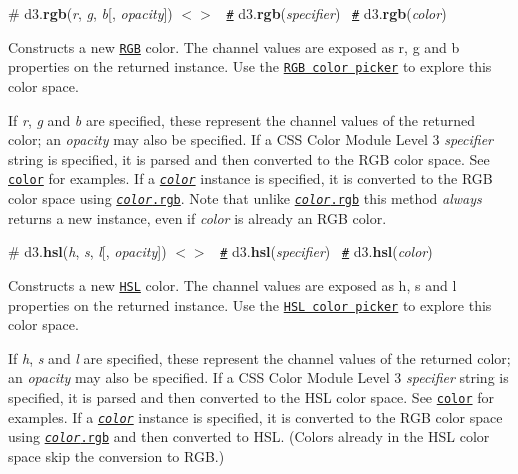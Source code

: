 \label{_rgb}%
\# d3.{\bfseries rgb}({\itshape r}, {\itshape g}, {\itshape b}\mbox{[}, {\itshape opacity}\mbox{]}) \href{https://github.com/d3/d3-color/blob/master/src/color.js#L209}{\tt $<$$>$}~\newline
 \href{#rgb}{\tt \#} d3.{\bfseries rgb}({\itshape specifier})~\newline
 \href{#rgb}{\tt \#} d3.{\bfseries rgb}({\itshape color})~\newline


Constructs a new \href{https://en.wikipedia.org/wiki/RGB_color_model}{\tt R\+GB} color. The channel values are exposed as {\ttfamily r}, {\ttfamily g} and {\ttfamily b} properties on the returned instance. Use the \href{http://bl.ocks.org/mbostock/78d64ca7ef013b4dcf8f}{\tt R\+GB color picker} to explore this color space.

If {\itshape r}, {\itshape g} and {\itshape b} are specified, these represent the channel values of the returned color; an {\itshape opacity} may also be specified. If a C\+SS Color Module Level 3 {\itshape specifier} string is specified, it is parsed and then converted to the R\+GB color space. See \href{#color}{\tt color} for examples. If a \href{#color}{\tt {\itshape color}} instance is specified, it is converted to the R\+GB color space using \href{#color_rgb}{\tt {\itshape color}.rgb}. Note that unlike \href{#color_rgb}{\tt {\itshape color}.rgb} this method {\itshape always} returns a new instance, even if {\itshape color} is already an R\+GB color.

\label{_hsl}%
\# d3.{\bfseries hsl}({\itshape h}, {\itshape s}, {\itshape l}\mbox{[}, {\itshape opacity}\mbox{]}) \href{https://github.com/d3/d3-color/blob/master/src/color.js#L281}{\tt $<$$>$}~\newline
 \href{#hsl}{\tt \#} d3.{\bfseries hsl}({\itshape specifier})~\newline
 \href{#hsl}{\tt \#} d3.{\bfseries hsl}({\itshape color})~\newline


Constructs a new \href{https://en.wikipedia.org/wiki/HSL_and_HSV}{\tt H\+SL} color. The channel values are exposed as {\ttfamily h}, {\ttfamily s} and {\ttfamily l} properties on the returned instance. Use the \href{http://bl.ocks.org/mbostock/debaad4fcce9bcee14cf}{\tt H\+SL color picker} to explore this color space.

If {\itshape h}, {\itshape s} and {\itshape l} are specified, these represent the channel values of the returned color; an {\itshape opacity} may also be specified. If a C\+SS Color Module Level 3 {\itshape specifier} string is specified, it is parsed and then converted to the H\+SL color space. See \href{#color}{\tt color} for examples. If a \href{#color}{\tt {\itshape color}} instance is specified, it is converted to the R\+GB color space using \href{#color_rgb}{\tt {\itshape color}.rgb} and then converted to H\+SL. (Colors already in the H\+SL color space skip the conversion to R\+GB.)

